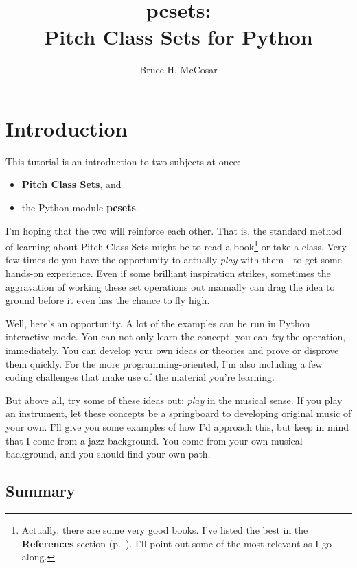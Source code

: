 \documentclass[letterpaper,12pt,oneside]{book}
\title{
  {\bf pcsets}:\\
  Pitch Class Sets for Python
}
\author{Bruce H. McCosar}
\begin{document}
\maketitle

\tableofcontents


\chapter{Introduction}

This tutorial is an introduction to two subjects at once:

\begin{itemize}
\item {\bf Pitch Class Sets}, and
\item the Python module {\bf pcsets}.
\end{itemize}

I'm hoping that the two will reinforce each other. That is, the
standard method of learning about Pitch Class Sets might be to read a
book\footnote{ Actually, there are some very good books. I've listed
the best in the {\bf References} section (p.~\pageref{references}).
I'll point out some of the most relevant as I go along. } or take a
class. Very few times do you have the opportunity to actually {\em
play} with them---to get some hands-on experience. Even if some
brilliant inspiration strikes, sometimes the aggravation of working
these set operations out manually can drag the idea to ground before
it even has the chance to fly high.

Well, here's an opportunity. A lot of the examples can be run in
Python interactive mode. You can not only learn the concept, you
can {\em try} the operation, immediately. You can develop your own
ideas or theories and prove or disprove them quickly. For the more
programming-oriented, I'm also including a few coding challenges that
make use of the material you're learning.

But above all, try some of these ideas out: {\em play} in the musical
sense. If you play an instrument, let these concepts be a springboard
to developing original music of your own. I'll give you some examples
of how I'd approach this, but keep in mind that I come from a jazz
background. You come from your own musical background, and you should
find your own path.


\section{Summary}
\end{document}
